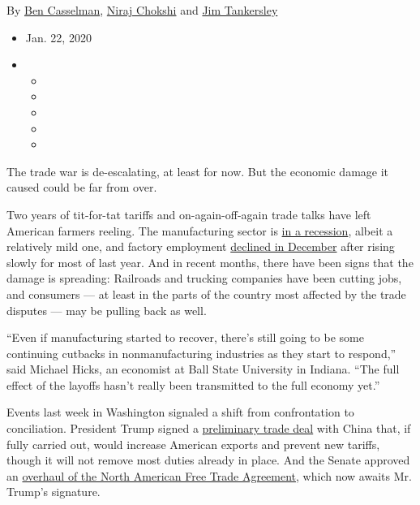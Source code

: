 By \href{https://www.nytimes3xbfgragh.onion/by/ben-casselman}{Ben
Casselman},
\href{https://www.nytimes3xbfgragh.onion/by/niraj-chokshi}{Niraj
Chokshi} and
\href{https://www.nytimes3xbfgragh.onion/by/jim-tankersley}{Jim
Tankersley}

\begin{itemize}
\item
  Jan. 22, 2020
\item
  \begin{itemize}
  \item
  \item
  \item
  \item
  \item
  \end{itemize}
\end{itemize}

The trade war is de-escalating, at least for now. But the economic
damage it caused could be far from over.

Two years of tit-for-tat tariffs and on-again-off-again trade talks have
left American farmers reeling. The manufacturing sector is
\href{https://www.washingtonpost.com/business/2020/01/17/us-manufacturing-was-mild-recession-during-2019-sore-spot-economy/}{in
a recession}, albeit a relatively mild one, and factory employment
\href{https://www.nytimes3xbfgragh.onion/2020/01/10/business/economy/december-jobs-report.html}{declined
in December} after rising slowly for most of last year. And in recent
months, there have been signs that the damage is spreading: Railroads
and trucking companies have been cutting jobs, and consumers --- at
least in the parts of the country most affected by the trade disputes
--- may be pulling back as well.

``Even if manufacturing started to recover, there's still going to be
some continuing cutbacks in nonmanufacturing industries as they start to
respond,'' said Michael Hicks, an economist at Ball State University in
Indiana. ``The full effect of the layoffs hasn't really been transmitted
to the full economy yet.''

Events last week in Washington signaled a shift from confrontation to
conciliation. President Trump signed a
\href{https://www.nytimes3xbfgragh.onion/2020/01/15/business/economy/china-trade-deal.html}{preliminary
trade deal} with China that, if fully carried out, would increase
American exports and prevent new tariffs, though it will not remove most
duties already in place. And the Senate approved an
\href{https://www.nytimes3xbfgragh.onion/2020/01/16/us/politics/usmca-vote.html}{overhaul
of the North American Free Trade Agreement}, which now awaits Mr.
Trump's signature.

